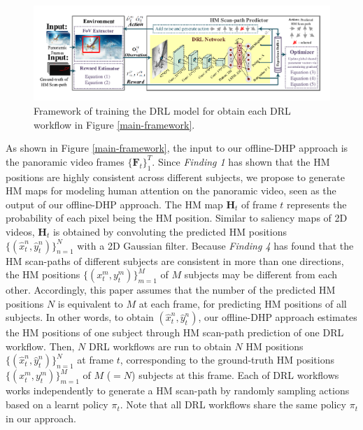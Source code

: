 \documentclass[10pt,journal,compsoc]{IEEEtran}
\begin{document}
\begin{figure}
	\begin{center}
		\centerline{\includegraphics[width=1\columnwidth]{figures/dhp_approach/training_framework}}%
		\caption{\footnotesize{Framework of training the DRL model for obtain each DRL workflow in Figure \ref{main-framework}.}}
		\label{train-framework}
	\end{center}
\end{figure}


As shown in Figure \ref{main-framework}, the input to our offline-DHP approach is the panoramic video frames $\{\mathbf{F}_t\}_1^{T}$.
Since \textit{Finding 1} has shown that the HM positions are highly consistent across different subjects,  we propose to generate HM maps for modeling human attention on the panoramic video, seen as the output of our offline-DHP approach. The HM map $\mathbf{H}_t$ of frame $t$ represents the probability of each pixel being the HM position.
Similar to saliency maps of 2D videos, $\mathbf{H}_t$ is obtained by convoluting the predicted HM positions $\{(\hat{x}^n_t, \hat{y}^n_t)\}_{n=1}^{N}$ with a 2D Gaussian filter.
Because \textit{Finding 4} has found that the HM scan-paths of different subjects are consistent in more than one directions, the HM positions $\{({x}^m_t, {y}^m_t)\}_{m=1}^{M}$ of $M$ subjects may be different from each other. Accordingly, this paper assumes that the number of the predicted HM positions $N$ is equivalent to $M$ at each frame, for predicting HM positions of all subjects.
In other words, to obtain $(\hat{x}^n_t, \hat{y}^n_t)$, our offline-DHP approach estimates the HM positions of one subject through HM scan-path prediction of one DRL workflow.
Then, $N$ DRL workflows are run to obtain $N$ HM positions $\{(\hat{x}^n_t, \hat{y}^n_t)\}_{n=1}^{N}$ at frame $t$, corresponding to the ground-truth HM positions  $\{({x}^m_t, {y}^m_t)\}_{m=1}^{M}$ of $M$ ($=N$) subjects at this frame.
Each of DRL workflows works independently to generate a HM scan-path by randomly sampling actions based on a learnt policy $\pi_t$.
Note that all DRL workflows share the same policy $\pi_t$ in our approach.
\end{document}
